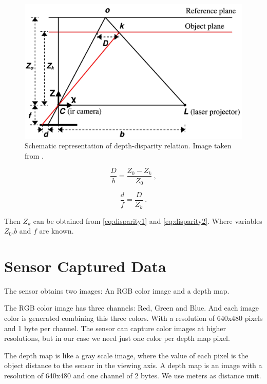 \begin{figure}[h!]
\begin{center}
\includegraphics[scale=1.65]{images/kinect_triangulation}
\caption{Schematic representation of depth-disparity relation. Image taken from \cite{khoshelham2011accuracy}.}
\label{fig:disparity}
\end{center}
\end{figure}

\begin{equation}
\label{eq:disparity1}
 \frac{D}{b} = \frac{Z_0 - Z_k}{Z_0}\ ,
\end{equation}


\begin{equation}
\label{eq:disparity2}
 \frac{d}{f} = \frac{D}{Z_k}\ . 
\end{equation}

Then $Z_k$ can be obtained from \ref{eq:disparity1} and \ref{eq:disparity2}. Where variables $Z_0$,$b$ and $f$ are known.

\section{Sensor Captured Data}
\label{sec:sensor_data}

The sensor obtains two images: An RGB color image and a depth map. 

The RGB color image has three channels: Red, Green and Blue. And each image color is generated 
combining this three colors. With a resolution of 640x480 pixels and 1 byte per channel. The sensor can 
capture color images at higher resolutions, but in our case we need just one color per depth map pixel.

The depth map is like a gray scale image, where the value of each pixel is the object distance to the sensor in the viewing axis. 
A depth map is an image with a resolution of 640x480 and one channel of 2 bytes. We use meters as distance unit.

